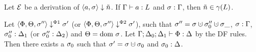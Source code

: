 \begin{lemma}
    \label{lem:gamma-arithm}
    Let $\operatorname{\mathcal{E}}$ be a derivation of $\bigstep{a}{\sigma}{\flaggedn{}}$.
    If $\Gamma \vdash {a}: L$ and ${\sigma}:{\Gamma}$, then $\flaggedn{} \in \gamma(L)$.
\end{lemma}

\begin{lemma}
    \label{thm:preservation-phi}
    Let $\langle \Phi, \Theta, \sigma'' \rangle \downarrow^{\Phi1} \sigma'$ (or $\langle \Phi, \Theta, \sigma'' \rangle \downarrow^{\Phi2} \sigma'$),
    such that $\store'' = \store \dunion \store_0''\dunion \store{\_}$, ${\sigma}:{\Gamma}$, 
    ${\sigma_0''}:{\Delta_1}$ (or ${\sigma_0''}:{\Delta_2}$) and $\Theta = \text{dom }{\sigma}$.
    Let $\Gamma;\Delta_0;\Delta_1 \vdash {\Phi}: \Delta$ by the DF rules.
    Then there exists a $\sigma_0$ such that $\store' = \store \dunion \store_0$
    and ${\sigma_0}:{\Delta}$.
\end{lemma}

